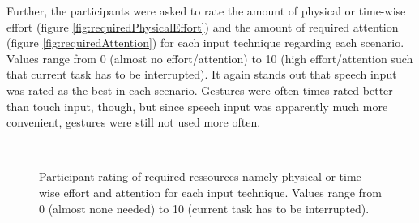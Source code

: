\newpage

Further, the participants were asked to rate the amount of physical or time-wise effort (figure \ref{fig:requiredPhysicalEffort}) and the amount of required attention (figure \ref{fig:requiredAttention}) for each input technique regarding each scenario. Values range from 0 (almost no effort/attention) to 10 (high effort/attention such that current task has to be interrupted). It again stands out that speech input was rated as the best in each scenario. Gestures were often times rated better than touch input, though, but since speech input was apparently much more convenient, gestures were still not used more often.

\begin{figure}[h]
	\myfloatalign
	 \\
	\caption{Participant rating of required ressources namely physical or time-wise effort and attention for each input technique. Values range from 0 (almost none needed) to 10 (current task has to be interrupted).}
	\label{fig:requiredRessources}
\end{figure}

